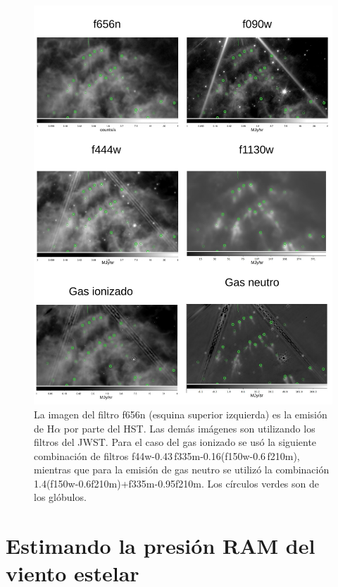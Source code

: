 \documentclass{book}
\begin{document}
\begin{figure}[htb]
    \centering
    \includegraphics[width=\textwidth]{imagenes_corregidas/Arreglo_04.pdf}
    \caption{La imagen del filtro f656n (esquina superior izquierda) es la emisión de H$\alpha$ por parte del HST. Las demás imágenes son utilizando los filtros del JWST. Para el caso del gas ionizado se usó la siguiente combinación de filtros f44w-0.43\,f335m-0.16(f150w-0.6\,f210m), mientras que para la emisión de gas neutro se utilizó la combinación 1.4(f150w-0.6\;f210m)+f335m-0.95\;f210m. Los círculos verdes son de los glóbulos.}
    \label{fig:filters WR124}
\end{figure}

\section{Estimando la presión RAM del viento estelar}
\end{document}
